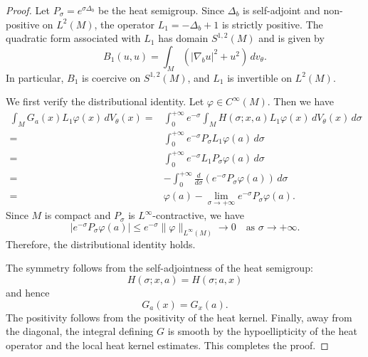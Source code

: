 \documentclass[11pt]{article}
\numberwithin{equation}{section}
\numberwithin{equation}{section}
\begin{document}
	\begin{proof}
		Let \(P_\sigma = e^{\sigma \Delta_b}\) be the heat semigroup. Since \(\Delta_b\) is self-adjoint and non-positive on \(L^2(M)\), the operator \(L_1 = -\Delta_b + 1\) is strictly positive. The quadratic form associated with \(L_1\) has domain \(S^{1,2}(M)\) and is given by
		\[
		B_1(u,u)=\int_M(|\nabla_bu|^2+u^2)\,dv_\theta.
		\]
		In particular, \(B_1\) is coercive on \(S^{1,2}(M)\), and \(L_1\) is invertible on \(L^2(M)\).
		
		We first verify the distributional identity. Let \(\varphi \in C^\infty(M)\). Then we have
		\[
		\begin{aligned}
			\int_M G_a(x) L_1 \varphi(x) \,d V_\theta(x) =& \int_0^{+\infty} e^{-\sigma} \int_M H(\sigma; x, a) L_1 \varphi(x)\,d V_\theta(x) \,d\sigma\\
			=& \int_0^{+\infty} e^{-\sigma} P_\sigma L_1 \varphi(a) \,d\sigma\\
			=& \int_0^{+\infty} e^{-\sigma} L_1 P_\sigma \varphi(a) \,d\sigma\\
			=& -\int_0^{+\infty} \frac{d}{d\sigma}(e^{-\sigma}  P_\sigma \varphi(a)) \,d\sigma\\
			=& \varphi(a) - \lim_{\sigma \to +\infty} e^{-\sigma} P_\sigma \varphi(a).
		\end{aligned}
		\]
		Since \(M\) is compact and \(P_\sigma\) is \(L^{\infty}\)-contractive, we have
		\[
		|e^{-\sigma} P_\sigma \varphi(a)| \leq e^{-\sigma} \|\varphi\|_{L^\infty(M)} \to 0 \quad \text{as } \sigma \to +\infty.
		\]
		Therefore, the distributional identity holds.
		
		The symmetry follows from the self-adjointness of the heat semigroup:
		\[
		H(\sigma; x, a) = H(\sigma; a, x)
		\]
		and hence
		\[
		G_a(x)= G_x(a).
		\]
		The positivity follows from the positivity of the heat kernel. Finally, away from the diagonal, the integral defining \(G\) is smooth by the hypoellipticity of the heat operator and the local heat kernel estimates. This completes the proof.
	\end{proof}
	
\end{document}
